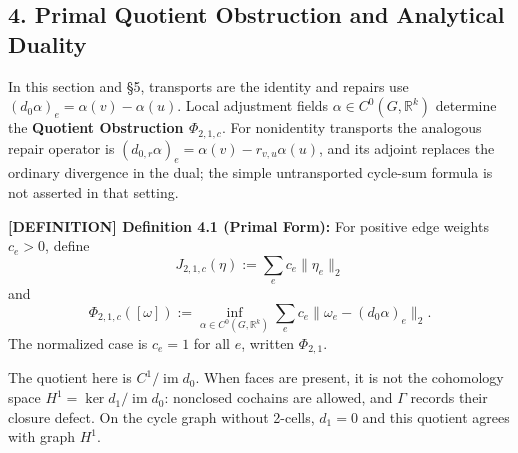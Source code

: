 \documentclass[
  11pt,
]{article}
\begin{document}
\subsection{4. Primal Quotient Obstruction and Analytical
Duality}\label{primal-quotient-obstruction-and-analytical-duality}

In this section and §5, transports are the identity and repairs use
\((d_0\alpha)_e=\alpha(v)-\alpha(u)\). Local adjustment fields
\(\alpha\in C^0(G,\mathbb R^k)\) determine the \textbf{Quotient
Obstruction \(\Phi_{2,1,c}\)}. For nonidentity transports the analogous
repair operator is \((d_{0,r}\alpha)_e=\alpha(v)-r_{v,u}\alpha(u)\), and
its adjoint replaces the ordinary divergence in the dual; the simple
untransported cycle-sum formula is not asserted in that setting.

\textbf{{[}DEFINITION{]} Definition 4.1 (Primal Form):} For positive
edge weights \(c_e>0\), define \[
J_{2,1,c}(\eta):=\sum_e c_e\|\eta_e\|_2
\] and \[
\Phi_{2,1,c}([\omega])
:=
\inf_{\alpha\in C^0(G,\mathbb R^k)}
\sum_e c_e\|\omega_e-(d_0\alpha)_e\|_2.
\] The normalized case is \(c_e=1\) for all \(e\), written
\(\Phi_{2,1}\).

The quotient here is \(C^1/\operatorname{im}d_0\). When faces are
present, it is not the cohomology space
\(H^1=\ker d_1/\operatorname{im}d_0\): nonclosed cochains are allowed,
and \(\Gamma\) records their closure defect. On the cycle graph without
2-cells, \(d_1=0\) and this quotient agrees with graph \(H^1\).
\end{document}
